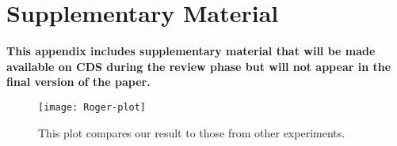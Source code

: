\clearpage

\section{Supplementary Material}
\label{sec:Supplementary-App}

{\bf This appendix includes supplementary material that will be made
  available on CDS during the review phase but will not appear in the
  final version of the paper.}

\begin{figure}[!htb]
  \begin{center}
    \texttt{[image: Roger-plot]}
    \vspace*{-1.0cm}
  \end{center}
  \caption{
    \small %
    This plot compares our result to those from other experiments.}
  \label{fig:roger}
\end{figure}

\clearpage
